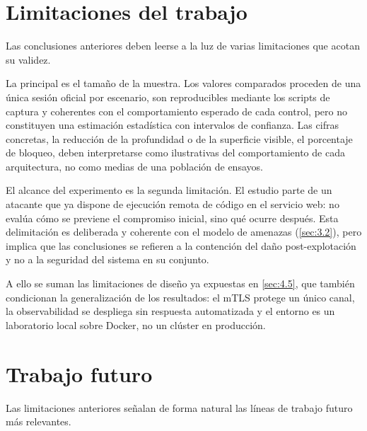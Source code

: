 \documentclass[11pt,spanish,listoffigures,listoftables]{tfgetsinf}
\begin{document}
        \section{Limitaciones del trabajo}
        \label{sec:7.2}
        Las conclusiones anteriores deben leerse a la luz de varias limitaciones que acotan su validez.

        La principal es el tamaño de la muestra. Los valores comparados proceden de una única sesión oficial por escenario, son reproducibles mediante los scripts de captura y coherentes con el comportamiento esperado de cada control, pero no constituyen una estimación estadística con intervalos de confianza. Las cifras concretas, la reducción de la profundidad o de la superficie visible, el porcentaje de bloqueo, deben interpretarse como ilustrativas del comportamiento de cada arquitectura, no como medias de una población de ensayos.

        El alcance del experimento es la segunda limitación. El estudio parte de un atacante que ya dispone de ejecución remota de código en el servicio web: no evalúa cómo se previene el compromiso inicial, sino qué ocurre después. Esta delimitación es deliberada y coherente con el modelo de amenazas (\cref{sec:3.2}), pero implica que las conclusiones se refieren a la contención del daño post-explotación y no a la seguridad del sistema en su conjunto.

        A ello se suman las limitaciones de diseño ya expuestas en \cref{sec:4.5}, que también condicionan la generalización de los resultados: el mTLS protege un único canal, la observabilidad se despliega sin respuesta automatizada y el entorno es un laboratorio local sobre Docker, no un clúster en producción.

        

        \section{Trabajo futuro}
        Las limitaciones anteriores señalan de forma natural las líneas de trabajo futuro más relevantes.
\end{document}
